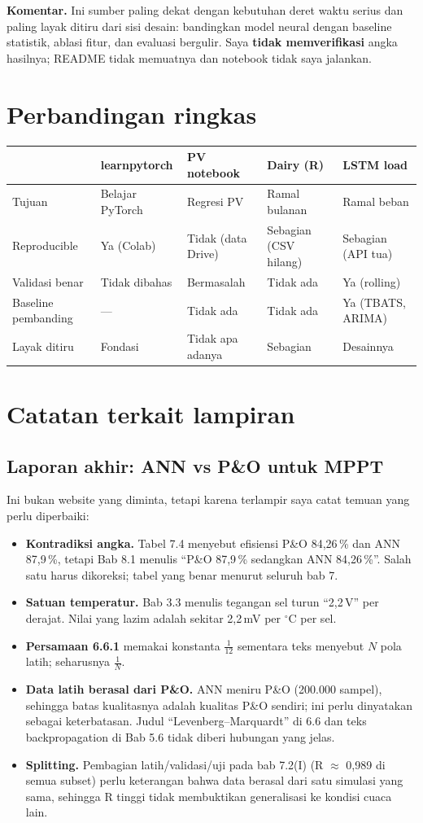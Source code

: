 \documentclass[11pt,a4paper]{article}
\newcommand{\bad}[1]{\textcolor{red!70!black}{#1}}
\begin{document}
\textbf{Komentar.} Ini sumber paling dekat dengan kebutuhan deret waktu serius dan paling layak ditiru dari sisi desain: bandingkan model neural dengan baseline statistik, ablasi fitur, dan evaluasi bergulir. Saya \textbf{tidak memverifikasi} angka hasilnya; README tidak memuatnya dan notebook tidak saya jalankan.

\section{Perbandingan ringkas}
\begin{tabular}{@{}p{3.4cm}p{2.6cm}p{2.5cm}p{2.5cm}p{2.5cm}@{}}
\toprule
 & learnpytorch & PV notebook & Dairy (R) & LSTM load \\
\midrule
Tujuan & Belajar PyTorch & Regresi PV & Ramal bulanan & Ramal beban \\
Reproducible & Ya (Colab) & Tidak (data Drive) & Sebagian (CSV hilang) & Sebagian (API tua) \\
Validasi benar & Tidak dibahas & \bad{Bermasalah} & \bad{Tidak ada} & Ya (rolling) \\
Baseline pembanding & --- & Tidak ada & Tidak ada & Ya (TBATS, ARIMA) \\
Layak ditiru & Fondasi & Tidak apa adanya & Sebagian & Desainnya \\
\bottomrule
\end{tabular}

\section{Catatan terkait lampiran}
\subsection{Laporan akhir: ANN vs P\&O untuk MPPT}
Ini bukan website yang diminta, tetapi karena terlampir saya catat temuan yang perlu diperbaiki:
\begin{itemize}
  \item \textbf{Kontradiksi angka.} Tabel 7.4 menyebut efisiensi P\&O 84,26\,\% dan ANN 87,9\,\%, tetapi Bab 8.1 menulis ``P\&O 87,9\,\% sedangkan ANN 84,26\,\%''. Salah satu harus dikoreksi; tabel yang benar menurut seluruh bab 7.
  \item \textbf{Satuan temperatur.} Bab 3.3 menulis tegangan sel turun ``2,2\,V'' per derajat. Nilai yang lazim adalah sekitar 2,2\,mV per $^\circ$C per sel.
  \item \textbf{Persamaan 6.6.1} memakai konstanta $\tfrac{1}{12}$ sementara teks menyebut $N$ pola latih; seharusnya $\tfrac{1}{N}$.
  \item \textbf{Data latih berasal dari P\&O.} ANN meniru P\&O (200.000 sampel), sehingga batas kualitasnya adalah kualitas P\&O sendiri; ini perlu dinyatakan sebagai keterbatasan. Judul ``Levenberg--Marquardt'' di 6.6 dan teks backpropagation di Bab 5.6 tidak diberi hubungan yang jelas.
  \item \textbf{Splitting.} Pembagian latih/validasi/uji pada bab 7.2(I) (R $\approx$ 0,989 di semua subset) perlu keterangan bahwa data berasal dari satu simulasi yang sama, sehingga R tinggi tidak membuktikan generalisasi ke kondisi cuaca lain.
\end{itemize}
\end{document}
